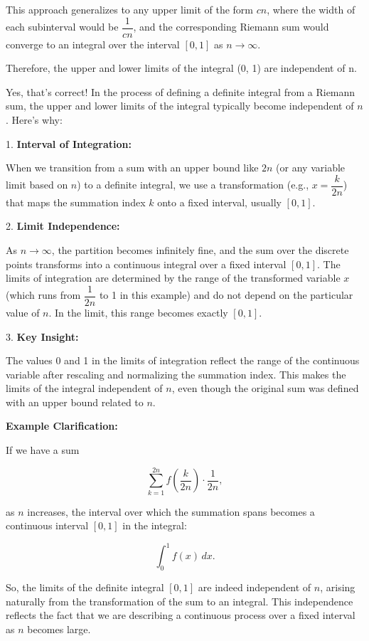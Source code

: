 \documentclass[a4paper,12pt]{book}
\begin{document}
This approach generalizes to any upper limit of the form \(cn\), where the width of each subinterval would be \(\dfrac{1}{cn}\), and the corresponding Riemann sum would converge to an integral over the interval \([0, 1]\) as \(n \to \infty\).

\begin{bluebox}
Therefore, the upper and lower limits of the integral (0, 1) are independent of n.
\end{bluebox}

Yes, that's correct! In the process of defining a definite integral from a Riemann sum, the upper and lower limits of the integral typically become independent of \(n\). Here’s why:

1. \textbf{Interval of Integration:}

   When we transition from a sum with an upper bound like \(2n\) (or any variable limit based on \(n\)) to a definite integral, we use a transformation (e.g., \(x = \dfrac{k}{2n}\)) that maps the summation index \(k\) onto a fixed interval, usually \([0, 1]\).

2. \textbf{Limit Independence:}

   As \(n \to \infty\), the partition becomes infinitely fine, and the sum over the discrete points transforms into a continuous integral over a fixed interval \([0, 1]\). The limits of integration are determined by the range of the transformed variable \(x\) (which runs from \(\dfrac{1}{2n}\) to 1 in this example) and do not depend on the particular value of \(n\). In the limit, this range becomes exactly \([0, 1]\).

3. \textbf{Key Insight:}

   The values 0 and 1 in the limits of integration reflect the range of the continuous variable after rescaling and normalizing the summation index. This makes the limits of the integral independent of \(n\), even though the original sum was defined with an upper bound related to \(n\).

\textbf{Example Clarification:}

If we have a sum

\[
\sum_{k=1}^{2n} f\left(\dfrac{k}{2n}\right) \cdot \dfrac{1}{2n},
\]

as \(n\) increases, the interval over which the summation spans becomes a continuous interval \([0, 1]\) in the integral:

\[
\int_0^1 f(x) \, dx.
\]

So, the limits of the definite integral \([0, 1]\) are indeed independent of \(n\), arising naturally from the transformation of the sum to an integral. This independence reflects the fact that we are describing a continuous process over a fixed interval as \(n\) becomes large.
\end{document}
